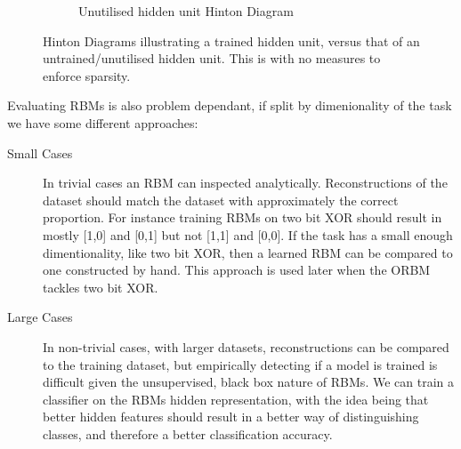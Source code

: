 \begin{figure}[h]
\begin{subfigure}[t]{0.3\textwidth}
        \caption{Unutilised hidden unit Hinton Diagram}
        \label{F:Hinton-Bad}
    \end{subfigure}
    \caption{Hinton Diagrams illustrating a trained hidden unit, versus that of an untrained/unutilised hidden unit. This is with no measures to enforce sparsity.}\label{fig:mnist-worse-best-results}
\end{figure}

    Evaluating RBMs is also problem dependant, if split by dimenionality of the task we have some different approaches:
    \begin{description}
    \item[Small Cases] In trivial cases an RBM can inspected analytically. Reconstructions of the dataset should match the dataset with approximately the correct proportion. For instance training RBMs on two bit XOR should result in mostly [1,0] and [0,1] but not [1,1] and [0,0].
    If the task has a small enough dimentionality, like two bit XOR, then a learned RBM can be compared to one constructed by hand. This approach is used later when the ORBM tackles two bit XOR.

    \item[Large Cases] In non-trivial cases, with larger datasets, reconstructions can be compared to the training dataset,  but empirically detecting if a model is trained is difficult given the unsupervised, black box nature of RBMs.
    We can train a classifier on the RBMs hidden representation, with the idea being that better hidden features should result in a better way of distinguishing classes, and therefore a better classification accuracy.

  \end{description}
